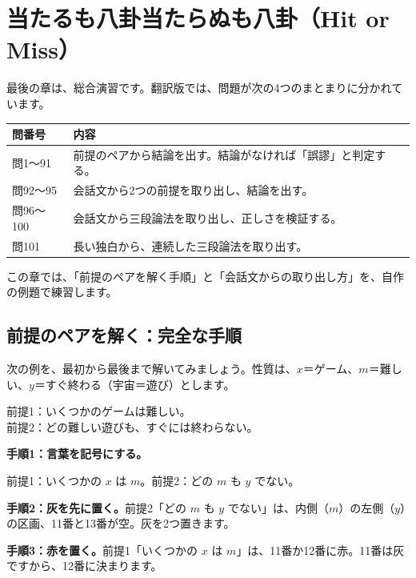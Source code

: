 \documentclass[a4paper,11pt,openany]{ltjsbook}
\begin{document}
\chapter{当たるも八卦当たらぬも八卦（Hit or Miss）}

最後の章は、総合演習です。翻訳版では、問題が次の4つのまとまりに分かれています。

\begin{center}
\begin{tabular}{lp{8cm}}
\toprule
問番号 & 内容 \\
\midrule
問1〜91 & 前提のペアから結論を出す。結論がなければ「誤謬」と判定する。\\
問92〜95 & 会話文から2つの前提を取り出し、結論を出す。\\
問96〜100 & 会話文から三段論法を取り出し、正しさを検証する。\\
問101 & 長い独白から、連続した三段論法を取り出す。\\
\bottomrule
\end{tabular}
\end{center}

この章では、「前提のペアを解く手順」と「会話文からの取り出し方」を、自作の例題で練習します。

\section{前提のペアを解く：完全な手順}

次の例を、最初から最後まで解いてみましょう。性質は、$x$＝ゲーム、$m$＝難しい、$y$＝すぐ終わる（宇宙＝遊び）とします。

\begin{center}
前提1：いくつかのゲームは難しい。\\
前提2：どの難しい遊びも、すぐには終わらない。
\end{center}

\textbf{手順1：言葉を記号にする。}

\begin{center}
前提1：いくつかの $x$ は $m$。\qquad 前提2：どの $m$ も $y$ でない。
\end{center}

\textbf{手順2：灰を先に置く。}前提2「どの $m$ も $y$ でない」は、内側（$m$）の左側（$y$）の区画、11番と13番が空。灰を2つ置きます。

\textbf{手順3：赤を置く。}前提1「いくつかの $x$ は $m$」は、11番か12番に赤。11番は灰ですから、12番に決まります。
\end{document}
